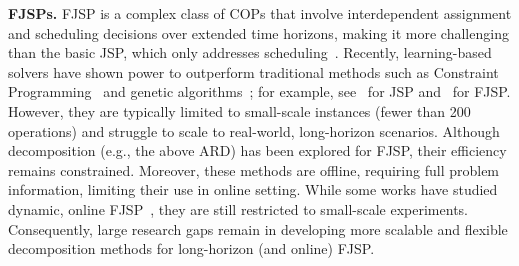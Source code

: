 \textbf{FJSPs.} 
FJSP is a complex class of COPs that involve interdependent assignment and scheduling decisions over extended time horizons, making it more challenging than the basic JSP, which only addresses scheduling~\citep{dauzere2023flexible}. Recently, learning-based solvers have shown power to outperform traditional methods such as Constraint Programming~\citep{cpsatlp} and genetic algorithms~\citep{li2016effective}; for example, see~\cite{zhang2020learning, zhang2024learning, zhang2024deep} for JSP and~\cite{wang2023learning, song2022flexible} for FJSP. However, they are typically limited to small-scale instances (fewer than 200 operations) and struggle to scale to real-world, long-horizon scenarios. Although decomposition (e.g., the above ARD) has been explored for FJSP, their efficiency remains constrained. Moreover, these methods are offline, requiring full problem information, limiting their use in online setting. While some works have studied dynamic, online FJSP~\cite {luo2021real, lei2023large}, they are still restricted to small-scale experiments. Consequently, large research gaps remain in developing more scalable and flexible decomposition methods for long-horizon (and online) FJSP.